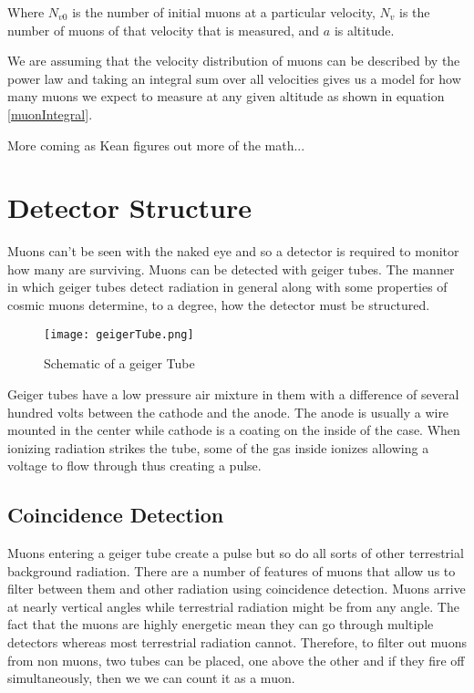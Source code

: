 \documentclass[oneside]{article}
\begin{document}
  \begin{center}
    Where $N_{v0}$ is the number of initial muons at a particular velocity, $N_v$ is the number of muons of that velocity that is measured, and $a$ is altitude.
  \end{center}

  We are assuming that the velocity distribution of muons can be described by the power law and taking an integral sum over all velocities gives us a model for how many muons we expect to measure at any given altitude as shown in equation \ref{muonIntegral}.

  More coming as Kean figures out more of the math...

  \section{Detector Structure}

  Muons can't be seen with the naked eye and so a detector is required to monitor how many are surviving. Muons can be detected with geiger tubes. The manner in which geiger tubes detect radiation in general along with some properties of cosmic muons determine, to a degree, how the detector must be structured.

  \begin{figure}[H]
      \centering
      \texttt{[image: geigerTube.png]}
      \caption{Schematic of a geiger Tube}
      \label{geigerTube}
  \end{figure}

  Geiger tubes have a low pressure air mixture in them with a difference of several hundred volts between the cathode and the anode. The anode is usually a wire mounted in the center while cathode is a coating on the inside of the case. When ionizing radiation strikes the tube, some of the gas inside ionizes allowing a voltage to flow through thus creating a pulse.

  \subsection{Coincidence Detection}
  Muons entering a geiger tube create a pulse but so do all sorts of other terrestrial background radiation. There are a number of features of muons that allow us to filter between them and other radiation using coincidence detection. Muons arrive at nearly vertical angles while terrestrial radiation might be from any angle. The fact that the muons are highly energetic mean they can go through multiple detectors whereas most terrestrial radiation cannot. Therefore, to filter out muons from non muons, two tubes can be placed, one above the other and if they fire off simultaneously, then we we can count it as a muon.
\end{document}
